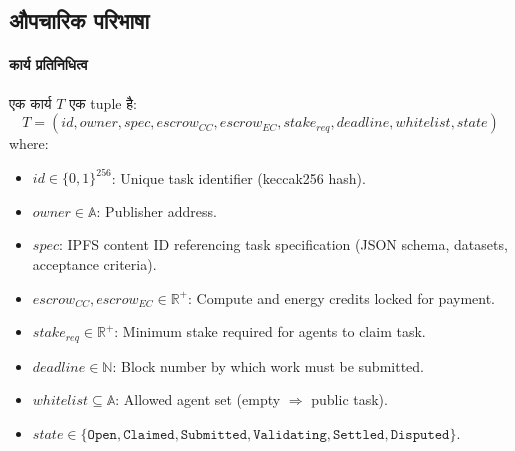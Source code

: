 \documentclass[11pt]{article}
\begin{document}
\begin{itemize}[noitemsep]
\begin{itemize}[noitemsep]
\subsection{औपचारिक परिभाषा}
\paragraph{कार्य प्रतिनिधित्व} एक कार्य $T$ एक tuple है:
\begin{equation}
T = (id, owner, spec, escrow_{CC}, escrow_{EC}, stake_{req}, deadline, whitelist, state)
\end{equation}
where:
\begin{itemize}[noitemsep]
  \item $id \in \{0,1\}^{256}$: Unique task identifier (keccak256 hash).
  \item $owner \in \mathbb{A}$: Publisher address.
  \item $spec$: IPFS content ID referencing task specification (JSON schema, datasets, acceptance criteria).
  \item $escrow_{CC}, escrow_{EC} \in \mathbb{R}^+$: Compute and energy credits locked for payment.
  \item $stake_{req} \in \mathbb{R}^+$: Minimum stake required for agents to claim task.
  \item $deadline \in \mathbb{N}$: Block number by which work must be submitted.
  \item $whitelist \subseteq \mathbb{A}$: Allowed agent set (empty $\Rightarrow$ public task).
  \item $state \in \{\texttt{Open}, \texttt{Claimed}, \texttt{Submitted}, \texttt{Validating}, \texttt{Settled}, \texttt{Disputed}\}$.
\end{itemize}


\end{itemize}
\end{itemize}
\end{document}
